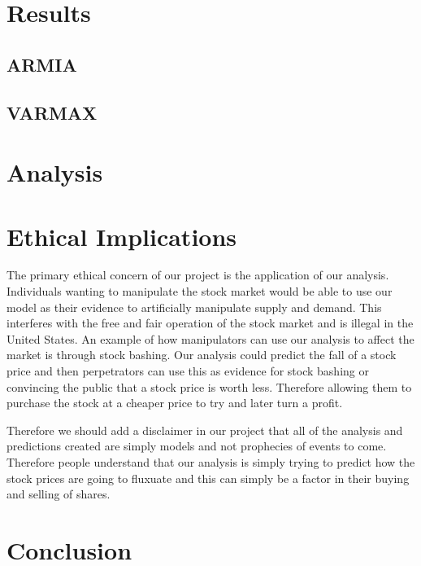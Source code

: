 \documentclass[12pt]{article}
\begin{document}
\section{Results}

\subsection{ARMIA}

\subsection{VARMAX}

\section{Analysis}

\section{Ethical Implications}

The primary ethical concern of our project is the application of our analysis. Individuals wanting to manipulate the stock market would be able to use our model as their evidence to artificially manipulate supply and demand. This interferes with the free and fair operation of the stock market and is illegal in the United States. An example of how manipulators can use our analysis to affect the market is through stock bashing. Our analysis could predict the fall of a stock price and then perpetrators can use this as evidence for stock bashing or convincing the public that a stock price is worth less. Therefore allowing them to purchase the stock at a cheaper price to try and later turn a profit. \par
Therefore we should add a disclaimer in our project that all of the analysis and predictions created are simply models and not prophecies of events to come. Therefore people understand that our analysis is simply trying to predict how the stock prices are going to fluxuate and this can simply be a factor in their buying and selling of shares.
\section{Conclusion}
\end{document}
